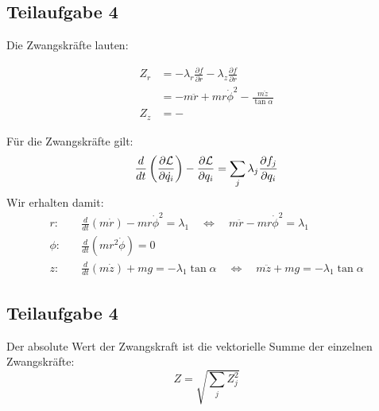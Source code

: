 \documentclass[a4paper,german,12pt,smallheadings]{scrartcl}
\begin{document}
\subsection*{Teilaufgabe 4}

Die Zwangskräfte lauten:

\begin{align*}
  Z_r &= -\lambda_r \frac{\partial f}{\partial r} - \lambda_z \frac{\partial f}{\partial r} \\
      &= -m\ddot{r} + mr\dot{\phi}^2 - \frac{m\ddot{z}}{\tan \alpha} \\
  Z_z &= -
\end{align*}

Für die Zwangskräfte gilt:
\begin{equation*}
\frac{d}{dt}\left(\frac{\partial \mathcal{L}}{\partial \dot{q_i}}\right)-\frac{\partial \mathcal{L}}{\partial q_i}=\sum\limits_j \lambda_j \frac{\partial f_j}{\partial q_i}\\
\end{equation*}
Wir erhalten damit:
\begin{align*}
r: & \quad \frac{d}{dt}\left(m\dot{r}\right)-mr\dot{\phi}^2=\lambda_1 \quad \Leftrightarrow \quad m\ddot{r}-mr\dot{\phi}^2=\lambda_1\\
\phi: & \quad \frac{d}{dt}\left(mr^2\dot{\phi}\right)=0\\
z: & \quad \frac{d}{dt}\left(m\dot{z}\right)+mg=-\lambda_1 \tan \alpha \quad \Leftrightarrow \quad m\ddot{z}+mg=-\lambda_1 \tan \alpha
\end{align*}

\subsection*{Teilaufgabe 4}
Der absolute Wert der Zwangskraft ist die vektorielle Summe der einzelnen Zwangskräfte:
\begin{equation*}
Z=\sqrt{\sum \limits_j Z_j^2}
\end{equation*}
\end{document}
